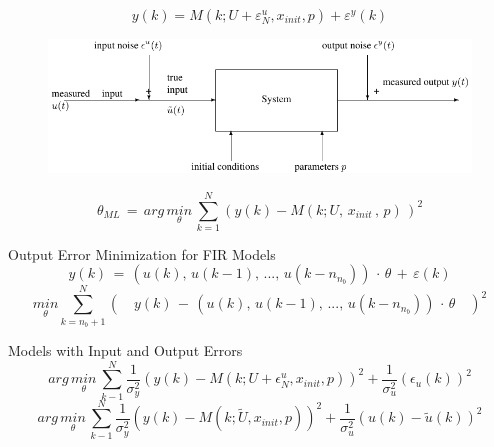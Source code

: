 \begin{tcolorbox}[colback=green!5!white,colframe=green!75!black,title=Model with Input and Output Errors:] 
	\begin{equation*}
	y(k)=M(k;U+{\varepsilon  }_{ N }^{ u },{ x }_{ init },p)+{ { \varepsilon }^{ y } }(k)
	\end{equation*}
\begin{figure}[H]
	\centering
	\includegraphics[width=\linewidth]{./model.pdf}
	\label{model}
\end{figure}
\end{tcolorbox}

\begin{tcolorbox}[colback=green!5!white,colframe=green!75!black,title=Pure Output Error (OE) Minimization]
\begin{equation*}
\theta _{ ML } \, =\, arg\, \underset { \theta  }{ min } \, \sum _{ k=1 }^{ N }{ (y(k)-M(k;U,\, x_{ init }\, ,\, p)\, )^{ 2 } }
\end{equation*}

Output Error Minimization for FIR Models
\begin{equation*}
y(k) \, = \, (u(k),\, u(k-1),\, ...,\, u(k-n_{n_b})) \, \cdot \, \theta \, + \, \varepsilon(k)
\end{equation*}
\begin{equation*}
\underset { \theta  }{ min } \sum _{ k=n_{ b }+1 }^{ N }{ (\quad y(k)\, -\, (u(k),\, u(k-1),\, ...,\, u(k-n_{ n_{ b } }))\, \cdot \, \theta \quad )^{ 2 } } 
\end{equation*}

Models with Input and Output Errors
\begin{equation*}
arg \, \underset { \theta  }{ min } \, \sum _{ k-1 }^{ N }{ \frac { 1 }{ { \sigma  }_{ y }^{ 2 } }  } { (y(k)-M(k;U+{ \epsilon  }_{ N }^{ u },{ x }_{ init },p)) }^{ 2 }+\frac { 1 }{ { \sigma  }_{ u }^{ 2 } } { ({ \epsilon  }_{ u }(k)) }^{ 2 }
\end{equation*}
\begin{equation*}
arg \, \underset { \theta  }{ min } \, \sum _{ k-1 }^{ N }{ \frac { 1 }{ { \sigma  }_{ y }^{ 2 } }  } { (y(k)-M(k;\tilde { U } ,{ x }_{ init },p)) }^{ 2 }+\frac { 1 }{ { \sigma  }_{ u }^{ 2 } } { (u(k)-\tilde{ u }(k) ) }^{ 2 }
\end{equation*}
\end{tcolorbox}